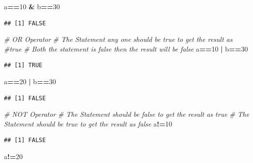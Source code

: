 \documentclass[
]{article}
\newenvironment{Shaded}{\begin{snugshade}}{\end{snugshade}}
\newcommand{\CommentTok}[1]{\textcolor[rgb]{0.56,0.35,0.01}{\textit{#1}}}
\newcommand{\DecValTok}[1]{\textcolor[rgb]{0.00,0.00,0.81}{#1}}
\newcommand{\NormalTok}[1]{#1}
\newcommand{\SpecialCharTok}[1]{\textcolor[rgb]{0.81,0.36,0.00}{\textbf{#1}}}
\begin{document}
\begin{Shaded}
\begin{Highlighting}[]
\NormalTok{a}\SpecialCharTok{==}\DecValTok{10} \SpecialCharTok{\&}\NormalTok{ b}\SpecialCharTok{==}\DecValTok{30}
\end{Highlighting}
\end{Shaded}

\begin{verbatim}
## [1] FALSE
\end{verbatim}

\begin{Shaded}
\begin{Highlighting}[]
\CommentTok{\# OR Operator}
\CommentTok{\# The Statement any one should be true to get the result as \#true}
\CommentTok{\# Both the statement is false then the result will be false}
\NormalTok{a}\SpecialCharTok{==}\DecValTok{10} \SpecialCharTok{|}\NormalTok{ b}\SpecialCharTok{==}\DecValTok{30}
\end{Highlighting}
\end{Shaded}

\begin{verbatim}
## [1] TRUE
\end{verbatim}

\begin{Shaded}
\begin{Highlighting}[]
\NormalTok{a}\SpecialCharTok{==}\DecValTok{20} \SpecialCharTok{|}\NormalTok{ b}\SpecialCharTok{==}\DecValTok{30}
\end{Highlighting}
\end{Shaded}

\begin{verbatim}
## [1] FALSE
\end{verbatim}

\begin{Shaded}
\begin{Highlighting}[]
\CommentTok{\# NOT Operator}
\CommentTok{\# The Statement should be false to get the result as true}
\CommentTok{\# The Statement should be true to get the result as false}
\NormalTok{a}\SpecialCharTok{!=}\DecValTok{10}
\end{Highlighting}
\end{Shaded}

\begin{verbatim}
## [1] FALSE
\end{verbatim}

\begin{Shaded}
\begin{Highlighting}[]
\NormalTok{a}\SpecialCharTok{!=}\DecValTok{20}
\end{Highlighting}
\end{Shaded}
\end{document}

